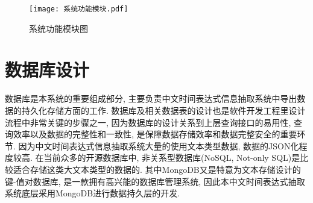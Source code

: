\begin{figure}[h]
  \centering
  \texttt{[image: 系统功能模块.pdf]}
  \caption{系统功能模块图}
  \label{fig:badge}
\end{figure}

\section{数据库设计}

数据库是本系统的重要组成部分, 主要负责中文时间表达式信息抽取系统中导出数据的持久化存储方面的工作.
数据库及相关数据表的设计也是软件开发工程里设计流程中非常关键的步骤之一, 因为数据库的设计关系到上层查询接口的易用性, 查询效率以及数据的完整性和一致性, 是保障数据存储效率和数据完整安全的重要环节.
因为中文时间表达式信息抽取系统大量的使用文本类型数据, 数据的JSON化程度较高. 在当前众多的开源数据库中, 非关系型数据库(NoSQL, Not-only SQL)是比较适合存储这类大文本类型的数据的.
其中MongoDB又是特意为文本存储设计的键-值对数据库, 是一款拥有高兴能的数据库管理系统, 因此本中文时间表达式抽取系统底层采用MongoDB进行数据持久层的开发.

